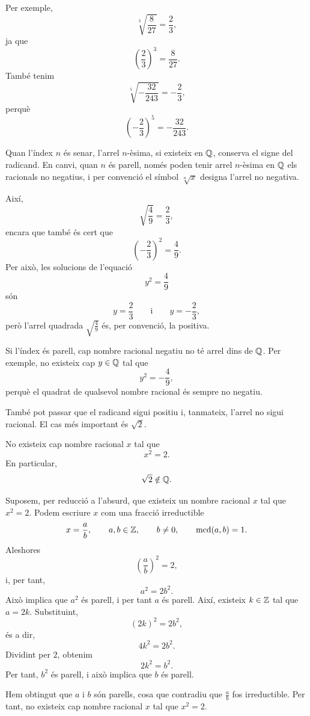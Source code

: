Per exemple,
\[
	\sqrt[3]{\frac{8}{27}}=\frac{2}{3},
\]
ja que
\[
	\left(\frac{2}{3}\right)^3=\frac{8}{27}.
\]
També tenim
\[
	\sqrt[5]{-\frac{32}{243}}=-\frac{2}{3},
\]
perquè
\[
	\left(-\frac{2}{3}\right)^5=-\frac{32}{243}.
\]

Quan l'índex \(n\) és senar, l'arrel \(n\)-èsima, si existeix en \(\mathbb{Q}\), conserva el signe del radicand. En canvi, quan \(n\) és parell, només poden tenir arrel \(n\)-èsima en \(\mathbb{Q}\) els racionals no negatius, i per convenció el símbol \(\sqrt[n]{x}\) designa l'arrel no negativa.

Així,
\[
	\sqrt{\frac{4}{9}}=\frac{2}{3},
\]
encara que també és cert que
\[
	\left(-\frac{2}{3}\right)^2=\frac{4}{9}.
\]
Per això, les solucions de l'equació
\[
	y^2=\frac{4}{9}
\]
són
\[
	y=\frac{2}{3}
	\qquad\text{i}\qquad
	y=-\frac{2}{3},
\]
però l'arrel quadrada \(\sqrt{\frac{4}{9}}\) és, per convenció, la positiva.

\begin{observacio}
Si l'índex és parell, cap nombre racional negatiu no té arrel dins de \(\mathbb{Q}\). Per exemple, no existeix cap \(y\in\mathbb{Q}\) tal que
\[
	y^2=-\frac{4}{9},
\]
perquè el quadrat de qualsevol nombre racional és sempre no negatiu.
\end{observacio}

També pot passar que el radicand sigui positiu i, tanmateix, l'arrel no sigui racional. El cas més important és \(\sqrt{2}\).

\begin{proposicio}
No existeix cap nombre racional \(x\) tal que
\[
	x^2=2.
\]
En particular,
\[
	\sqrt{2}\notin\mathbb{Q}.
\]
\end{proposicio}

\begin{prova}
Suposem, per reducció a l'absurd, que existeix un nombre racional \(x\) tal que \(x^2=2\). Podem escriure \(x\) com una fracció irreductible
\[
	x=\frac{a}{b},
	\qquad a,b\in\mathbb{Z},
	\qquad b\neq0,
	\qquad \operatorname{mcd}(a,b)=1.
\]
Aleshores
\[
	\left(\frac{a}{b}\right)^2=2,
\]
i, per tant,
\[
	a^2=2b^2.
\]
Això implica que \(a^2\) és parell, i per tant \(a\) és parell. Així, existeix \(k\in\mathbb{Z}\) tal que \(a=2k\). Substituint,
\[
	(2k)^2=2b^2,
\]
és a dir,
\[
	4k^2=2b^2.
\]
Dividint per \(2\), obtenim
\[
	2k^2=b^2.
\]
Per tant, \(b^2\) és parell, i això implica que \(b\) és parell.

Hem obtingut que \(a\) i \(b\) són parells, cosa que contradiu que \(\frac{a}{b}\) fos irreductible. Per tant, no existeix cap nombre racional \(x\) tal que \(x^2=2\).
\end{prova}

